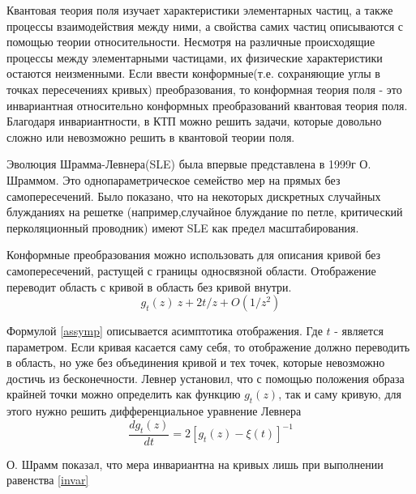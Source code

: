 \documentclass[12pt,a4paper]{article}
\begin{document}
	\par Квантовая теория поля изучает характеристики элементарных частиц, а также процессы взаимодействия между ними, а свойства самих частиц описываются с помощью теории относительности. Несмотря на различные происходящие процессы между элементарными частицами, их физические характеристики остаются неизменными. Если ввести конформные(т.е. сохраняющие углы в точках пересечениях кривых) преобразования, то конформная теория поля - это инвариантная относительно конформных преобразований квантовая теория поля. Благодаря инвариантности, в КТП можно решить задачи, которые довольно сложно или невозможно решить в квантовой теории поля.
	
	\par Эволюция Шрамма-Левнера(SLE)  была впервые представлена в 1999г О. Шраммом. Это однопараметрическое семейство мер на прямых без самопересечений. Было показано, что на некоторых дискретных случайных блужданиях на решетке (например,случайное блуждание по петле\cite{looperased}, критический перколяционный проводник\cite{critexplor}) имеют SLE как предел масштабирования. 
	\par Конформные преобразования можно использовать для описания кривой без самопересечений, растущей с границы односвязной области\cite{zatelep}. Отображение переводит область с кривой в область без кривой внутри.
	\begin{equation}\label{assymp}
		g_{t}(z) ~ z + 2t/z + O(1/z^{2})
	\end{equation}
	
	\par Формулой \ref{assymp} описывается асимптотика отображения. Где $t$ - является параметром. Если кривая касается саму себя, то отображение должно переводить в область, но уже без объединения кривой и тех точек, которые невозможно достичь из бесконечности. Левнер установил, что с помощью положения образа крайней точки можно определить как функцию $g_{t}(z)$\cite{lowner}, так и саму кривую, для этого нужно решить дифференциальное уравнение Левнера 
	\begin{equation}\label{sle_eq}
		\dfrac{dg_{t}(z)}{dt} = 2[g_{t}(z)-\xi(t)]^{-1}
	\end{equation}
	\par О. Шрамм показал, что мера инвариантна\cite{shram} на кривых лишь при выполнении равенства \ref{invar}
	
\end{document}
